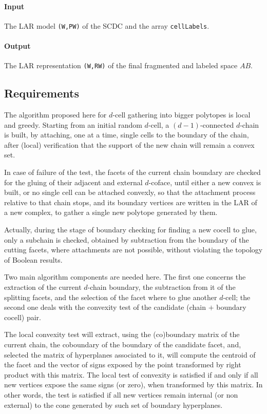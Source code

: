\documentclass[11pt,oneside]{article}	%
\begin{document}
\paragraph{Input}
The LAR model \texttt{(W,PW)} of the SCDC and the array \texttt{cellLabels}.

\paragraph{Output}
The LAR representation \texttt{(W,RW)} of the final fragmented and labeled space $AB$.


\subsection{Requirements}

The algorithm proposed here for $d$-cell gathering into bigger polytopes is local and greedy. Starting from an initial random $d$-cell, a $(d-1)$-connected $d$-chain is built, by attaching, one at a time, single cells to the boundary of the chain, after (local) verification that the support of the new chain will remain a convex set. 

In case of failure of the test, the facets of the current chain boundary are checked for the gluing of their adjacent and external $d$-coface, until either a new convex is built, or no single cell can be attached convexly, so that the attachment process relative to that chain stops, and its boundary vertices are written in the LAR of a new complex, to gather a single new polytope generated by them. 

Actually, during the stage of boundary checking for finding a new cocell to glue, only a subchain is checked, obtained by subtraction from the boundary of the cutting facets, where attachments are not possible, without
violating the topology of Boolean results. 

Two main algorithm components are needed here. The first one concerns the extraction of the current $d$-chain boundary, the subtraction from it of the splitting facets, and the selection of the facet where to glue another $d$-cell; the second one deals with the convexity test of the candidate (chain $+$ boundary cocell) pair.

The local convexity test will extract, using the (co)boundary matrix of the current chain, the coboundary of the boundary of the candidate facet, and, selected the matrix of hyperplanes associated to it, will compute the centroid of the facet and the vector of signs exposed by the point transformed by right product with this matrix. The local test of convexity is satisfied if and only if all new vertices expose the same signs (or zero), when transformed by this matrix. In other words, the test is satisfied  if all new vertices remain internal (or non external) to the cone generated by such set of boundary hyperplanes.
\end{document}

